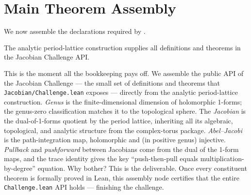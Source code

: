 \section{Main Theorem Assembly}
\label{sec:main-assembly}

We now assemble the declarations required by .

\begin{theorem}
\label{thm:challenge-api}
The analytic period-lattice construction supplies all definitions and theorems
in the Jacobian Challenge API.
\leanok
\end{theorem}

\begin{layman}
This is the moment all the bookkeeping pays off. We assemble the public
API of the Jacobian Challenge — the small set of definitions and
theorems that \texttt{Jacobian/Challenge.lean} exposes — directly from
the analytic period-lattice construction. \emph{Genus} is the
finite-dimensional dimension of holomorphic 1-forms; the genus-zero
classification matches it to the topological sphere. The
\emph{Jacobian} is the dual-of-1-forms quotient by the period lattice,
inheriting all its algebraic, topological, and analytic structure from
the complex-torus package. \emph{Abel–Jacobi} is the path-integration
map, holomorphic and (in positive genus) injective. \emph{Pullback}
and \emph{pushforward} between Jacobians come from the dual of the
1-form maps, and the trace identity gives the key
``push-then-pull equals multiplication-by-degree'' equation. Why
bother? This is the deliverable. Once every constituent theorem is
formally proved in Lean, this assembly node certifies that the entire
\texttt{Challenge.lean} API holds — finishing the challenge.
\end{layman}


